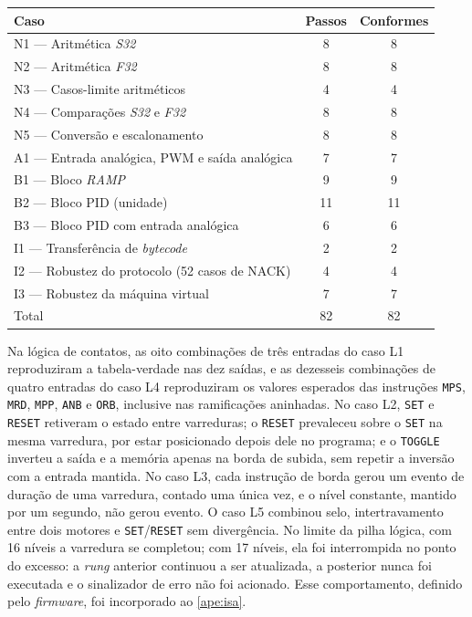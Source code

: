 \begin{tabelafixa}
    \centering
    \label{tab:resultados-numerico}
    \begin{tabular}{p{8.2cm}cc}
        \hline
        Caso & Passos & Conformes \\
        \hline
        N1 --- Aritmética \textit{S32} & 8 & 8 \\
        N2 --- Aritmética \textit{F32} & 8 & 8 \\
        N3 --- Casos-limite aritméticos & 4 & 4 \\
        N4 --- Comparações \textit{S32} e \textit{F32} & 8 & 8 \\
        N5 --- Conversão e escalonamento & 8 & 8 \\
        A1 --- Entrada analógica, PWM e saída analógica & 7 & 7 \\
        B1 --- Bloco \textit{RAMP} & 9 & 9 \\
        B2 --- Bloco PID (unidade) & 11 & 11 \\
        B3 --- Bloco PID com entrada analógica & 6 & 6 \\
        I1 --- Transferência de \textit{bytecode} & 2 & 2 \\
        I2 --- Robustez do protocolo (52 casos de NACK) & 4 & 4 \\
        I3 --- Robustez da máquina virtual & 7 & 7 \\
        \hline
        Total & 82 & 82 \\
        \hline
    \end{tabular}
    \vspace{14pt}
\end{tabelafixa}

Na lógica de contatos, as oito combinações de três entradas do caso L1 reproduziram a tabela-verdade nas dez saídas, e as dezesseis combinações de quatro entradas do caso L4 reproduziram os valores esperados das instruções \texttt{MPS}, \texttt{MRD}, \texttt{MPP}, \texttt{ANB} e \texttt{ORB}, inclusive nas ramificações aninhadas.
No caso L2, \texttt{SET} e \texttt{RESET} retiveram o estado entre varreduras; o \texttt{RESET} prevaleceu sobre o \texttt{SET} na mesma varredura, por estar posicionado depois dele no programa; e o \texttt{TOGGLE} inverteu a saída e a memória apenas na borda de subida, sem repetir a inversão com a entrada mantida.
No caso L3, cada instrução de borda gerou um evento de duração de uma varredura, contado uma única vez, e o nível constante, mantido por um segundo, não gerou evento.
O caso L5 combinou selo, intertravamento entre dois motores e \texttt{SET}/\texttt{RESET} sem divergência.
No limite da pilha lógica, com 16 níveis a varredura se completou; com 17 níveis, ela foi interrompida no ponto do excesso: a \textit{rung} anterior continuou a ser atualizada, a posterior nunca foi executada e o sinalizador de erro não foi acionado.
Esse comportamento, definido pelo \textit{firmware}, foi incorporado ao \ref{ape:isa}.


